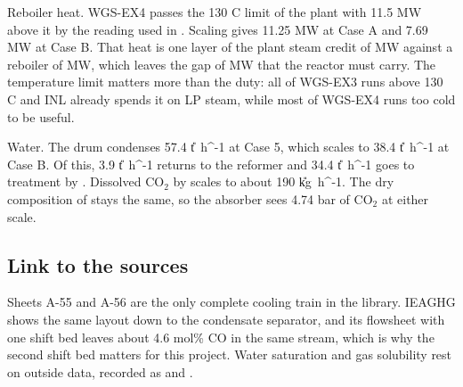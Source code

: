 Reboiler heat. WGS-EX4 passes the 130 C limit of the plant with 11.5 MW above it by the reading used in . Scaling gives 11.25 MW at Case A and 7.69 MW at Case B. That heat is one layer of the plant steam credit of \vQstackB{} MW against a reboiler of \vQrebB{} MW, which leaves the gap of \vQgapB{} MW that the reactor must carry. The temperature limit matters more than the duty: all of WGS-EX3 runs above 130 C and INL already spends it on LP steam, while most of WGS-EX4 runs too cold to be useful.

Water. The drum condenses 57.4 \U{t\ h^{-1}} at Case 5, which scales to 38.4 \U{t\ h^{-1}} at Case B. Of this, 3.9 \U{t\ h^{-1}} returns to the reformer and 34.4 \U{t\ h^{-1}} goes to treatment by . Dissolved CO$_2$ by  scales to about 190 \U{kg\ h^{-1}}. The dry composition of  stays the same, so the absorber sees 4.74 bar of CO$_2$ at either scale.

\subsection*{Link to the sources}
Sheets A-55 and A-56 are the only complete cooling train in the library. IEAGHG shows the same layout down to the condensate separator, and its flowsheet with one shift bed leaves about 4.6 mol\% CO in the same stream, which is why the second shift bed matters for this project. Water saturation and gas solubility rest on outside data, recorded as  and .
